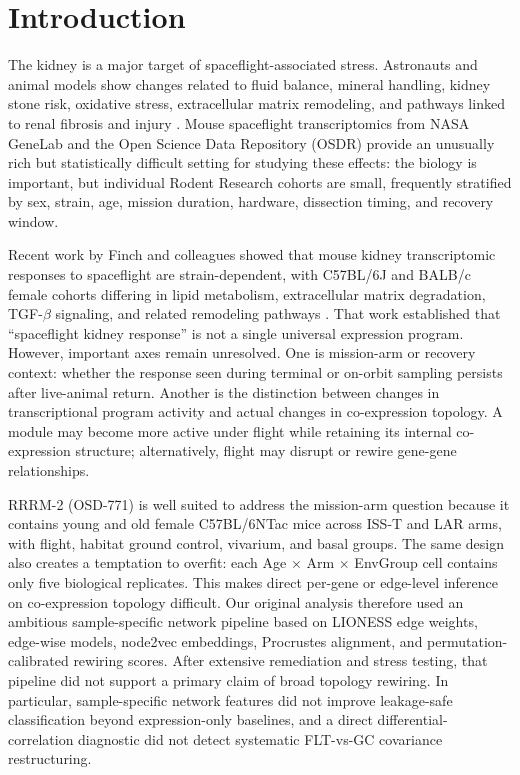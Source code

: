 \documentclass[11pt]{article}
\begin{document}
\tableofcontents
\clearpage

\section{Introduction}

The kidney is a major target of spaceflight-associated stress. Astronauts and animal models show changes related to fluid balance, mineral handling, kidney stone risk, oxidative stress, extracellular matrix remodeling, and pathways linked to renal fibrosis and injury \citep{cockett1962astronautical,smith2014men,siew2024cosmic}. Mouse spaceflight transcriptomics from NASA GeneLab and the Open Science Data Repository (OSDR) provide an unusually rich but statistically difficult setting for studying these effects: the biology is important, but individual Rodent Research cohorts are small, frequently stratified by sex, strain, age, mission duration, hardware, dissection timing, and recovery window.

Recent work by Finch and colleagues showed that mouse kidney transcriptomic responses to spaceflight are strain-dependent, with C57BL/6J and BALB/c female cohorts differing in lipid metabolism, extracellular matrix degradation, TGF-$\beta$ signaling, and related remodeling pathways \citep{finch2025strain}. That work established that ``spaceflight kidney response'' is not a single universal expression program. However, important axes remain unresolved. One is mission-arm or recovery context: whether the response seen during terminal or on-orbit sampling persists after live-animal return. Another is the distinction between changes in transcriptional program activity and actual changes in co-expression topology. A module may become more active under flight while retaining its internal co-expression structure; alternatively, flight may disrupt or rewire gene-gene relationships.

RRRM-2 (OSD-771) is well suited to address the mission-arm question because it contains young and old female C57BL/6NTac mice across ISS-T and LAR arms, with flight, habitat ground control, vivarium, and basal groups. The same design also creates a temptation to overfit: each Age $\times$ Arm $\times$ EnvGroup cell contains only five biological replicates. This makes direct per-gene or edge-level inference on co-expression topology difficult. Our original analysis therefore used an ambitious sample-specific network pipeline based on LIONESS edge weights, edge-wise models, node2vec embeddings, Procrustes alignment, and permutation-calibrated rewiring scores. After extensive remediation and stress testing, that pipeline did not support a primary claim of broad topology rewiring. In particular, sample-specific network features did not improve leakage-safe classification beyond expression-only baselines, and a direct differential-correlation diagnostic did not detect systematic FLT-vs-GC covariance restructuring.
\end{document}
